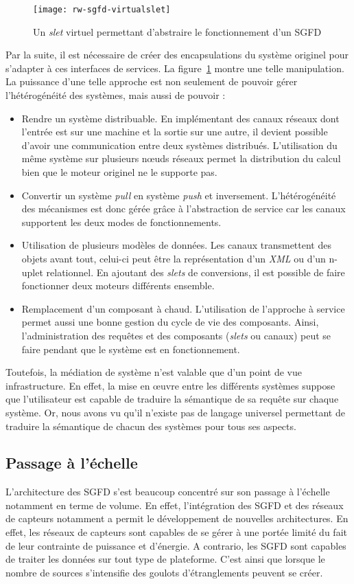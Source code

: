 \begin{figure}[ht]
    \centering
    \texttt{[image: rw-sgfd-virtualslet]}
    \caption{Un \textit{slet} virtuel permettant d'abstraire le fonctionnement d'un SGFD}\label{fig:rw:sgfd:virtualslet}
\end{figure}
Par la suite, il est nécessaire de créer des encapsulations du système originel pour s'adapter à ces interfaces de services. La figure~\ref{fig:rw:sgfd:virtualslet} montre une telle manipulation. La puissance d'une telle approche est non seulement de pouvoir gérer l'hétérogénéité des systèmes, mais aussi de pouvoir :
\begin{itemize}
	\item Rendre un système distribuable. En implémentant des canaux réseaux dont l'entrée est sur une machine et la sortie sur une autre, il devient possible d'avoir une communication entre deux systèmes distribués. L'utilisation du même système sur plusieurs nœuds réseaux permet la distribution du calcul bien que le moteur originel ne le supporte pas.
	\item Convertir un système \textit{pull} en système \textit{push} et inversement. L'hétérogénéité des mécanismes est donc gérée grâce à l'abstraction de service car les canaux supportent les deux modes de fonctionnements.
	\item Utilisation de plusieurs modèles de données. Les canaux transmettent des objets avant tout, celui-ci peut être la représentation d'un \textit{XML} ou d'un n-uplet relationnel. En ajoutant des \textit{slets} de conversions, il est possible de faire fonctionner deux moteurs différents ensemble.
	\item Remplacement d'un composant à chaud. L'utilisation de l'approche à service permet aussi une bonne gestion du cycle de vie des composants. Ainsi, l'administration des requêtes et des composants (\textit{slets} ou canaux) peut se faire pendant que le système est en fonctionnement.
\end{itemize}

Toutefois, la médiation de système n'est valable que d'un point de vue infrastructure. En effet, la mise en œuvre entre les différents systèmes suppose que l'utilisateur est capable de traduire la sémantique de sa requête sur chaque système. Or, nous avons vu qu'il n'existe pas de langage universel permettant de traduire la sémantique de chacun des systèmes pour tous ses aspects.

\subsection{Passage à l'échelle}
L'architecture des SGFD s'est beaucoup concentré sur son passage à l'échelle notamment en terme de volume. En effet, l'intégration des SGFD et des réseaux de capteurs notamment a permit le développement de nouvelles architectures. En effet, les réseaux de capteurs sont capables de se gérer à une portée limité du fait de leur contrainte de puissance et d'énergie. A contrario, les SGFD sont capables de traiter les données sur tout type de plateforme. C'est ainsi que lorsque le nombre de sources s'intensifie des goulots d'étranglements peuvent se créer.

